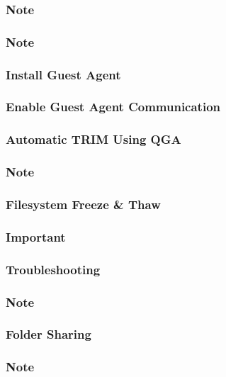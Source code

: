 \subsubsection{Note}

\subsubsection{Note}

\subsubsection{Install Guest Agent}

\subsubsection{Enable Guest Agent Communication}

\subsubsection{Automatic TRIM Using QGA}

\subsubsection{Note}

\subsubsection{Filesystem Freeze & Thaw}

\subsubsection{Important}

\subsubsection{Troubleshooting}

\subsubsection{Note}

\subsubsection{Folder Sharing}

\subsubsection{Note}

